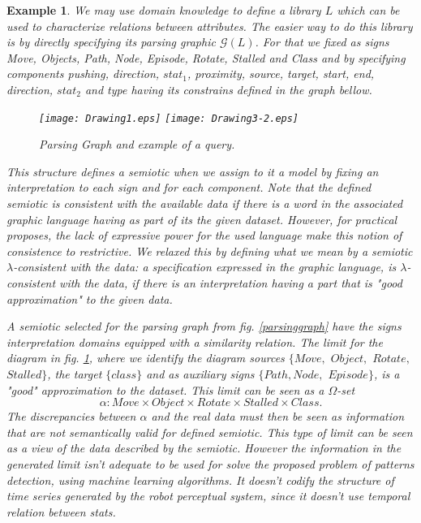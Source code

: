 \documentclass[oribibl]{llncs}
\newtheorem{exam}{Example}
\newcommand{\G}{\mathcal{G}}
\begin{document}
\begin{exam}
We may use domain knowledge to define a library $L$ which can be used to characterize relations between attributes. The easier way to do this library is by directly specifying its parsing graphic $\G(L)$. For that we fixed as signs \emph{Move}, \emph{Objects}, \emph{Path}, \emph{Node}, \emph{Episode}, \emph{Rotate}, \emph{Stalled} and \emph{Class} and by specifying components \emph{pushing}, \emph{direction}, $stat_1$, \emph{proximity}, \emph{source}, \emph{target}, \emph{start}, \emph{end}, \emph{direction}, $stat_2$ and \emph{type} having its constrains defined in the graph bellow.
\begin{figure}[h]
    \begin{center}
    \texttt{[image: Drawing1.eps]}
    \texttt{[image: Drawing3-2.eps]}
    \end{center}
    \caption{Parsing Graph and example of a query.}\label{parsinggraph}\label{query1}
\end{figure}

This structure defines a semiotic when we assign to it a model by fixing an interpretation to each sign and for each component. Note that the defined semiotic is consistent with the available data if there is a word in the associated graphic language having as part of its the given dataset. However, for practical proposes, the lack of expressive power for the used language make this notion of consistence to restrictive. We relaxed this by defining what we mean by a semiotic $\lambda$-consistent with the data: a specification expressed in the graphic language, is $\lambda$-consistent with the data, if there is an  interpretation having a part that is "good approximation" to the given data.

A semiotic selected for the parsing graph from fig. \ref{parsinggraph} have the signs interpretation domains equipped with a similarity relation. The limit for the diagram in fig. \ref{query1}, where we identify the diagram sources $\{Move,$ $Object,$ $Rotate,$ $Stalled\}$, the target $\{class\}$ and as auxiliary signs
$\{Path,Node,$ $Episode\}$, is a "good" approximation to the dataset. This limit can be seen as a $\Omega$-set \[\alpha:Move\times Object\times Rotate\times Stalled\times Class.\] The discrepancies between $\alpha$ and the real data must then be seen as information that are not semantically valid for defined semiotic. This type of limit can be seen as a view of the data described by the semiotic. However the information in the generated limit isn't adequate to be used for solve the proposed problem of patterns detection, using machine learning algorithms. It doesn't codify the structure of time series generated by the robot perceptual system, since it doesn't use temporal relation between stats.


\end{exam}
\end{document}
